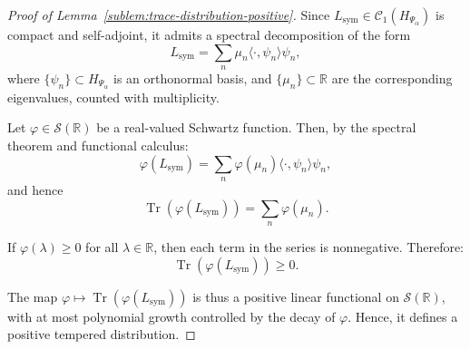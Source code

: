 \begin{proof}[Proof of Lemma~\ref{sublem:trace-distribution-positive}]
Since \( L_{\mathrm{sym}} \in \mathcal{C}_1(H_{\Psi_\alpha}) \) is compact and self-adjoint, it admits a spectral decomposition of the form
\[
L_{\mathrm{sym}} = \sum_n \mu_n \langle \cdot, \psi_n \rangle \psi_n,
\]
where \( \{ \psi_n \} \subset H_{\Psi_\alpha} \) is an orthonormal basis, and \( \{ \mu_n \} \subset \mathbb{R} \) are the corresponding eigenvalues, counted with multiplicity.

Let \( \varphi \in \mathcal{S}(\mathbb{R}) \) be a real-valued Schwartz function. Then, by the spectral theorem and functional calculus:
\[
\varphi(L_{\mathrm{sym}}) = \sum_n \varphi(\mu_n) \langle \cdot, \psi_n \rangle \psi_n,
\]
and hence
\[
\operatorname{Tr}(\varphi(L_{\mathrm{sym}})) = \sum_n \varphi(\mu_n).
\]

If \( \varphi(\lambda) \ge 0 \) for all \( \lambda \in \mathbb{R} \), then each term in the series is nonnegative. Therefore:
\[
\operatorname{Tr}(\varphi(L_{\mathrm{sym}})) \ge 0.
\]

The map \( \varphi \mapsto \operatorname{Tr}(\varphi(L_{\mathrm{sym}})) \) is thus a positive linear functional on \( \mathcal{S}(\mathbb{R}) \), with at most polynomial growth controlled by the decay of \( \varphi \). Hence, it defines a positive tempered distribution.
\end{proof}
